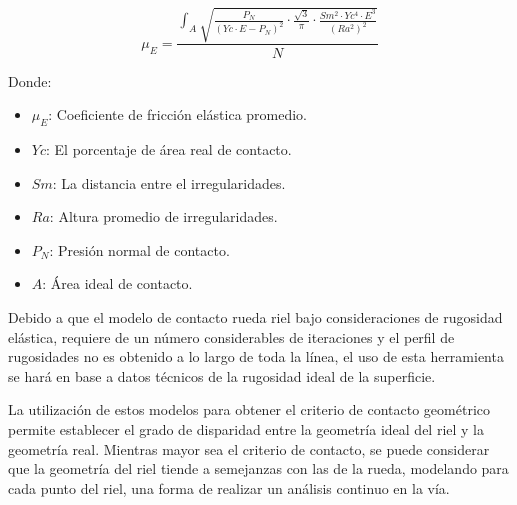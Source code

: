\documentclass[main]{subfiles}
\begin{document}
\begin{equation}
\mu_E=\frac{\int_A 
\sqrt{
\frac{P_N}{(Yc\cdot E-P_N)^2} 
\cdot
\frac{\sqrt{3}}{\pi}
\cdot 
\frac{Sm^2\cdot Yc^4\cdot E^3}{(Ra^2)^2}
}}{N}
\end{equation}

\par \hspace{2cm}
\begin{minipage}{8cm}
\begin{spacing}{0.5}
Donde:
\begin{itemize}
\item $\mu_E$: Coeficiente de fricción elástica promedio.
\item $Yc$: El porcentaje de área real de contacto.
\item $Sm$: La distancia entre el irregularidades.
\item $Ra$: Altura promedio de irregularidades.
\item $P_N$: Presión normal de contacto.
\item $A$: Área ideal de contacto.
\end{itemize}
\end{spacing}
\end{minipage}

Debido a que el modelo de contacto rueda riel bajo consideraciones de rugosidad elástica, requiere de un número considerables de iteraciones y el perfil de rugosidades no es obtenido a lo largo de toda la línea, el uso de esta herramienta se hará en base a datos técnicos de la rugosidad ideal de la superficie.

La utilización de estos modelos para obtener el criterio de contacto geométrico permite establecer el grado de disparidad entre la geometría ideal del riel y la geometría real. Mientras mayor sea el criterio de contacto, se puede considerar que la geometría del riel tiende a semejanzas con las de la rueda, modelando para cada punto del riel, una forma de realizar un análisis continuo en la vía.
\end{document}
